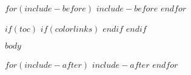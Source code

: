 \documentclass[ngerman,a4paper,$fontsize$,bibliography=totoc]{scrreprt}
\begin{document}
$for(include-before)$
$include-before$
$endfor$

$if(toc)$
{
$if(colorlinks)$
\hypersetup{linkcolor=$if(toccolor)$$toccolor$$else$black$endif$}
$endif$
\setcounter{tocdepth}{$toc-depth$}
\tableofcontents
}
$endif$

\setlength{\parindent}{0.25cm}

$body$

\printbibliography[title={Literatur},heading=bibintoc]

$for(include-after)$
$include-after$
$endfor$
\end{document}
